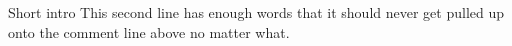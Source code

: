 Short intro %
This second line has enough words that it should never get pulled up onto the comment line above no matter what.
